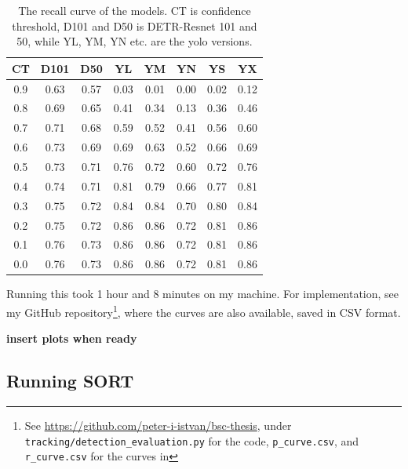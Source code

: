 \begin{table}
    \begin{centering}
    \begin{tabular}{|c||c|c|c|c|c|c|c|}
        \hline
        CT & D101 & D50 & YL & YM & YN & YS & YX \\
        \hline
        \hline
        0.9 & 0.63 & 0.57 & 0.03 & 0.01 & 0.00 & 0.02 & 0.12 \\
        \hline 
        0.8 & 0.69 & 0.65 & 0.41 & 0.34 & 0.13 & 0.36 & 0.46 \\
        \hline 
        0.7 & 0.71 & 0.68 & 0.59 & 0.52 & 0.41 & 0.56 & 0.60 \\
        \hline 
        0.6 & 0.73 & 0.69 & 0.69 & 0.63 & 0.52 & 0.66 & 0.69 \\
        \hline 
        0.5 & 0.73 & 0.71 & 0.76 & 0.72 & 0.60 & 0.72 & 0.76 \\
        \hline 
        0.4 & 0.74 & 0.71 & 0.81 & 0.79 & 0.66 & 0.77 & 0.81 \\
        \hline 
        0.3 & 0.75 & 0.72 & 0.84 & 0.84 & 0.70 & 0.80 & 0.84 \\
        \hline 
        0.2 & 0.75 & 0.72 & 0.86 & 0.86 & 0.72 & 0.81 & 0.86 \\
        \hline 
        0.1 & 0.76 & 0.73 & 0.86 & 0.86 & 0.72 & 0.81 & 0.86 \\
        \hline 
        0.0 & 0.76 & 0.73 & 0.86 & 0.86 & 0.72 & 0.81 & 0.86 \\
        \hline
    \end{tabular}
    \caption{The recall curve of the models. CT is confidence threshold, D101 and D50 is DETR-Resnet 101 and 50, while YL, YM, YN etc. are the yolo versions.}
    \label{tab:r_curve}
    \end{centering}
\end{table}

Running this took 1 hour and 8 minutes on my machine. For implementation, see my GitHub repository\footnote{See \url{https://github.com/peter-i-istvan/bsc-thesis}, under \texttt{tracking/detection\_evaluation.py} for the code, \texttt{p\_curve.csv}, and \texttt{r\_curve.csv} for the curves in }, where the curves are also available, saved in CSV format. 

\textbf{insert plots when ready}

\subsection{Running SORT}

